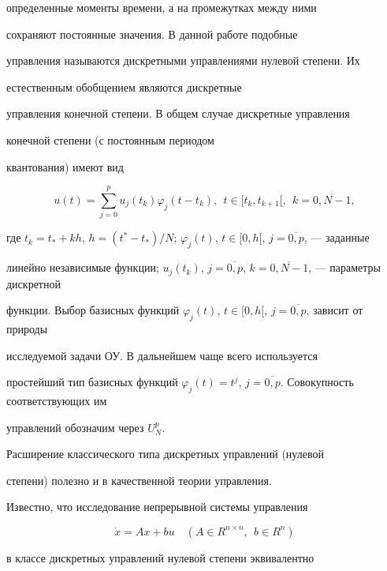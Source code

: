 определенные моменты времени, а на промежутках между ними


сохраняют постоянные значения. В данной работе подобные


управления называются дискретными управлениями нулевой степени. Их


естественным обобщением являются дискретные


управления конечной степени. В общем случае дискретные управления


конечной степени (с постоянным периодом


квантования) имеют вид


$$


u(t) = \sum\limits_{j=0}^{p} u_j(t_k) \varphi_j(t-t_k), \ \ t \in


[t_k, t_{k+1}[, \ \ k = \overline{0,N-1},


$$


где $t_k = t_*+kh$, $h = (t^*-t_*)/N$; $\varphi_j(t)$, $t


\in [0, h[$, $j = \overline{0, p}$, --- заданные


линейно независимые функции; $u_j(t_k)$, $j = \overline{0, p}$, $k


= \overline{0,N-1}$, --- параметры дискретной


функции. Выбор базисных функций $\varphi_j(t)$, $t \in [0,h[$, $j


= \overline{0,p}$, зависит от природы


исследуемой задачи ОУ. В дальнейшем чаще всего используется


простейший тип базисных функций $\varphi_j(t) =


t^{j}$, $j = \overline{0,p}$. Совокупность соответствующих им


управлений обозначим через $U_N^p$.





Расширение классического типа дискретных управлений (нулевой


степени) полезно и в качественной теории управления.


Известно, что исследование непрерывной системы управления


\begin{equation}\label{din_sys}


\Dot{x} = Ax + bu \quad (A \in R^{n \times n}, \ \ b \in R^n)


\end{equation}


в классе дискретных управлений нулевой степени эквивалентно


